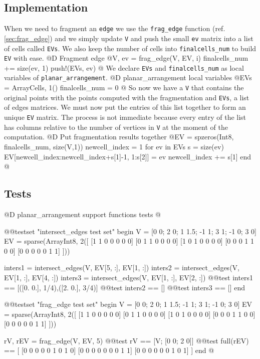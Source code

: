 \documentclass[10pt]{book}
\begin{document}
\subsection{Implementation}
When we need to fragment an \texttt{edge} we use the \texttt{frag\_edge} function (ref. \ref{sec:frag_edge}) 
and we simply update \texttt{V} and push the small \texttt{ev} matrix into a list of cells called \texttt{EVs}.
We also keep the number of cells into \texttt{finalcells\_num} to build \texttt{EV} with ease.
@D Fragment edge
@{V, ev = frag_edge(V, EV, i)
finalcells_num += size(ev, 1)
push!(EVs, ev)
@}
We declare \texttt{EVs} and \texttt{finalcells\_num} as local variables of \texttt{planar\_arrangement}.
@D planar\_arrangement local variables
@{EVs = Array{Cells, 1}()
finalcells_num = 0
@}
So now we have a \texttt{V} that contains the original points with the points computed with the fragmentation
and \texttt{EVs}, a list of edges matrices. We must now put the entries of this list together to form an unique
\texttt{EV} matrix. The process is not immediate because every entry of the list has columns relative to the 
number of vertices in \texttt{V} at the moment of the computation.
@D Put fragmentation results together
@{EV = spzeros(Int8, finalcells_num, size(V,1))
newcell_index = 1
for ev in EVs
    s = size(ev)
    EV[newcell_index:newcell_index+s[1]-1, 1:s[2]] = ev
    newcell_index += s[1]
end
@}
\subsection{Tests}
@D planar\_arrangement support functions tests
@{@@testset "intersect_edges test set" begin
    V = [0 0; 2 0; 1 1.5; -1 1; 3 1; -1 0; 3 0]
    EV = sparse(Array{Int8, 2}([
        [1 1 0 0 0 0 0]
        [0 1 1 0 0 0 0]
        [1 0 1 0 0 0 0]
        [0 0 0 1 1 0 0]
        [0 0 0 0 0 1 1]
    ]))

    inters1 = intersect_edges(V, EV[5, :], EV[1, :])
    inters2 = intersect_edges(V, EV[1, :], EV[4, :])
    inters3 = intersect_edges(V, EV[1, :], EV[2, :])
    @@test inters1 == [([0. 0.], 1/4),([2. 0.], 3/4)]
    @@test inters2 == []
    @@test inters3 == []
end

@@testset "frag_edge test set" begin
    V = [0 0; 2 0; 1 1.5; -1 1; 3 1; -1 0; 3 0]
    EV = sparse(Array{Int8, 2}([
        [1 1 0 0 0 0 0]
        [0 1 1 0 0 0 0]
        [1 0 1 0 0 0 0]
        [0 0 0 1 1 0 0]
        [0 0 0 0 0 1 1]
    ]))

    rV, rEV = frag_edge(V, EV, 5)
    @@test rV == [V; [0 0; 2 0]]
    @@test full(rEV) == [
        [0 0 0 0 0 1 0 1 0]
        [0 0 0 0 0 0 0 1 1]
        [0 0 0 0 0 0 1 0 1]
    ]
end
@}
\end{document}
